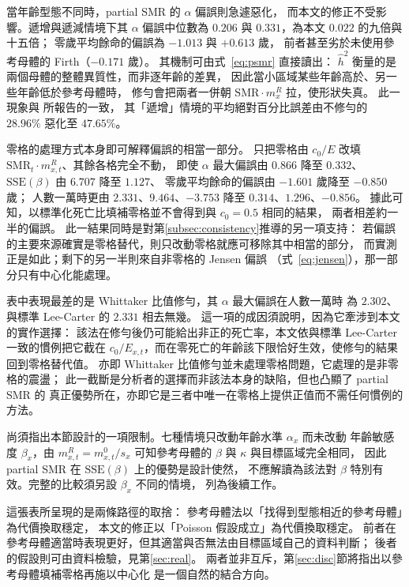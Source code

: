 \documentclass[UTF8, fontset=macnew, a4paper, 12pt]{ctexart}
\begin{document}
當年齡型態不同時，partial SMR 的 $\alpha$ 偏誤則急遽惡化，
而本文的修正不受影響。遞增與遞減情境下其 $\alpha$ 偏誤中位數為
$0.206$ 與 $0.331$，為本文 $0.022$ 的九倍與十五倍；
零歲平均餘命的偏誤為 $-1.013$ 與 $+0.613$ 歲，
前者甚至劣於未使用參考母體的 Firth（$-0.171$ 歲）。
其機制可由式~\eqref{eq:psmr} 直接讀出：
$\hat h^2$ 衡量的是兩個母體的整體異質性，而非逐年齡的差異，
因此當小區域某些年齡高於、另一些年齡低於參考母體時，
修勻會把兩者一併朝 $\mathrm{SMR}\cdot m^{R}_x$ 拉，使形狀失真。
此一現象與 \citet[Table 1]{yue2019}所報告的一致，
其「遞增」情境的平均絕對百分比誤差由不修勻的 $28.96\%$ 惡化至 $47.65\%$。

零格的處理方式本身即可解釋偏誤的相當一部分。
只把零格由 $c_0/E$ 改填 $\mathrm{SMR}_t\cdot m^{R}_{x,t}$、其餘各格完全不動，
即使 $\alpha$ 最大偏誤由 $0.866$ 降至 $0.332$、
$\mathrm{SSE}(\beta)$ 由 $6.707$ 降至 $1.127$、
零歲平均餘命的偏誤由 $-1.601$ 歲降至 $-0.850$ 歲；
人數一萬時更由 $2.331$、$9.464$、$-3.753$ 降至 $0.314$、$1.296$、$-0.856$。
據此可知，以標準化死亡比填補零格並不會得到與 $c_0=0.5$ 相同的結果，
兩者相差約一半的偏誤。
此一結果同時是對第\ref{subsec:consistency}推導的另一項支持：
若偏誤的主要來源確實是零格替代，則只改動零格就應可移除其中相當的部分，
而實測正是如此；剩下的另一半則來自非零格的 Jensen 偏誤
（式~\eqref{eq:jensen}），那一部分只有中心化能處理。

表中表現最差的是 Whittaker 比值修勻，其 $\alpha$ 最大偏誤在人數一萬時
為 $2.302$、與標準 Lee-Carter 的 $2.331$ 相去無幾。
這一項的成因須說明，因為它牽涉到本文的實作選擇：
該法在修勻後仍可能給出非正的死亡率，本文依與標準 Lee-Carter 一致的慣例把它截在
$c_0/E_{x,t}$，而在零死亡的年齡該下限恰好生效，使修勻的結果回到零格替代值。
亦即 Whittaker 比值修勻並未處理零格問題，它處理的是非零格的震盪；
此一截斷是分析者的選擇而非該法本身的缺陷，但也凸顯了 partial SMR 的
真正優勢所在，亦即它是三者中唯一在零格上提供正值而不需任何慣例的方法。

尚須指出本節設計的一項限制。七種情境只改動年齡水準 $\alpha_x$ 而未改動
年齡敏感度 $\beta_x$，由 $m^{R}_{x,t}=m^{0}_{x,t}/s_x$ 可知參考母體的
$\beta$ 與 $\kappa$ 與目標區域完全相同，
因此 partial SMR 在 $\mathrm{SSE}(\beta)$ 上的優勢是設計使然，
不應解讀為該法對 $\beta$ 特別有效。完整的比較須另設 $\beta_x$ 不同的情境，
列為後續工作。

這張表所呈現的是兩條路徑的取捨：
參考母體法以「找得到型態相近的參考母體」為代價換取穩定，
本文的修正以「Poisson 假設成立」為代價換取穩定。
前者在參考母體適當時表現更好，但其適當與否無法由目標區域自己的資料判斷；
後者的假設則可由資料檢驗，見第\ref{sec:real}。
兩者並非互斥，第\ref{sec:disc}節將指出以參考母體填補零格再施以中心化
是一個自然的結合方向。
\end{document}
